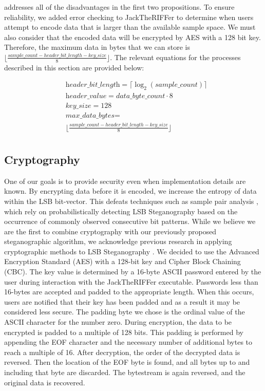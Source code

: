 addresses all of the disadvantages in the first two propositions. To ensure reliability, we added error checking to JackTheRIFFer to determine when users attempt to encode data that is larger than the available sample space. We must also consider that the encoded data will be encrypted by AES with a 128 bit key. Therefore, the maximum data in bytes that we can store is $\lfloor\frac{sample\_count - header\_bit\_length - key\_size}{8}\rfloor$. The relevant equations for the processes described in this section are provided below:

\begin{align*}
&\textit{header\_bit\_length} = 
\lceil\log_2(\textit{sample\_count})\rceil \\
&\textit{header\_value} = data\_byte\_count \cdot 8 \\
&\textit{key\_size} = 128 \\
&\textit{max\_data\_bytes} = \\
&\lfloor\frac{sample\_count - header\_bit\_length - key\_size}{8}\rfloor \\
\end{align*}

\subsection{Cryptography}
One of our goals is to provide security even when implementation details are known.
By encrypting data before it is encoded, we increase the entropy of data within the LSB bit-vector. This defeats techniques such as sample pair analysis \cite{paper2}, which rely on probabilistically detecting LSB Steganography based on the occurrence of commonly observed consecutive bit patterns. While we believe we are the first to combine cryptography with our previously proposed steganographic algorithm, we acknowledge previous research in applying cryptographic methods to LSB Steganography \cite{paper8}. We decided to use the Advanced Encryption Standard (AES) with a 128-bit key and Cipher Block Chaining (CBC). The key value is determined by a 16-byte ASCII password entered by the user during interaction with the JackTheRIFFer executable. Passwords less than 16-bytes are accepted and padded to the appropriate length. When this occurs, users are notified that their key has been padded and as a result it may be considered less secure. The padding byte we chose is the ordinal value of the ASCII character for the number zero. During encryption, the data to be encrypted is padded to a multiple of 128 bits. This padding is performed by appending the EOF character and the necessary number of additional bytes to reach a multiple of 16. After decryption, the order of the decrypted data is reversed. Then the location of the EOF byte is found, and all bytes up to and including that byte are discarded. The bytestream is again reversed, and the original data is recovered.

